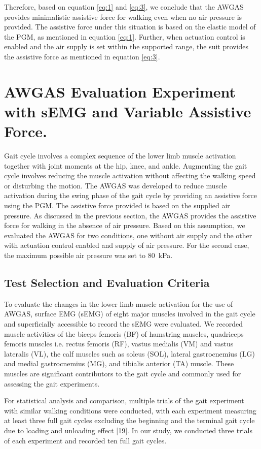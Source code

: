 \documentclass[paper,JRM,paper]{jaciiiarticle}
\begin{document}
Therefore, based on equation \ref{eq:1} and \ref{eq:3}, we conclude that the AWGAS provides minimalistic assistive force for walking even when no air pressure is provided. The assistive force under this situation is based on the elastic model of the PGM, as mentioned in equation \ref{eq:1}. Further, when actuation control is enabled and the air supply is set within the supported range, the suit provides the assistive force as mentioned in equation \ref{eq:3}.

\section{AWGAS Evaluation Experiment with sEMG and Variable Assistive Force.}

Gait cycle involves a complex sequence of the lower limb muscle activation together with joint moments at the hip, knee, and ankle. Augmenting the gait cycle involves reducing the muscle activation without affecting the walking speed or disturbing the motion. The AWGAS was developed to reduce muscle activation during the swing phase of the gait cycle by providing an assistive force using the PGM. The assistive force provided is based on the supplied air pressure. As discussed in the previous section, the AWGAS provides the assistive force for walking in the absence of air pressure. Based on this assumption, we evaluated the AWGAS for two conditions, one without air supply and the other with actuation control enabled and supply of air pressure. For the second case, the maximum possible air pressure was set to \SI{80}{\kilo\pascal}.

\subsection{Test Selection and Evaluation Criteria}
To evaluate the changes in the lower limb muscle activation for the use of AWGAS, surface EMG (sEMG) of eight major muscles involved in the gait cycle and superficially accessible to record the sEMG were evaluated. We recorded muscle activities of the biceps femoris (BF) of hamstring muscles, quadriceps femoris muscles i.e. rectus femoris (RF), vastus medialis (VM) and vastus lateralis (VL), the calf muscles such as soleus (SOL), lateral gastrocnemius (LG) and medial gastrocnemius (MG), and tibialis anterior (TA) muscle. These muscles are significant contributors to the gait cycle and commonly used for assessing the gait experiments. 

For statistical analysis and comparison, multiple trials of the gait experiment with similar walking conditions were conducted, with each experiment measuring at least three full gait cycles excluding the beginning and the terminal gait cycle due to loading and unloading effect [19]. In our study, we conducted three trials of each experiment and recorded ten full gait cycles. 
\end{document}
